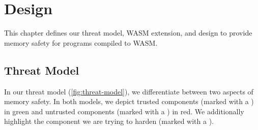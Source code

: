 \chapter{Design}
\label{ch:design}

This chapter defines our threat model, \ac{WASM} extension, and design to provide memory safety for programs compiled to \ac{WASM}.


\section{Threat Model}
\label{sec:threat-model}

In our threat model (\cref{fig:threat-model}), we differentiate between two aspects of memory safety.
In both models, we depict trusted components (marked with a ) in green and untrusted components (marked with a ) in red.
We additionally highlight the component we are trying to harden (marked with a ).

